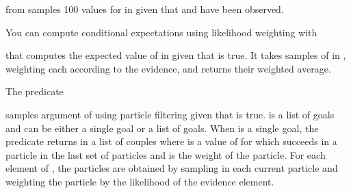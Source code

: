 \documentclass[letterpaper,10pt,english]{sphinxmanual}
\begin{document}
\sphinxAtStartPar
from  samples 100 values for  in  given that  and  have been observed.

\sphinxAtStartPar
You can compute conditional expectations using likelihood weighting with

\begin{sphinxVerbatim}[commandchars=\\\{\}]
  
\end{sphinxVerbatim}

\sphinxAtStartPar
that computes the expected value of  in  given that  is true.
It takes  samples of  in , weighting each according to the evidence, and returns their weighted average.

\sphinxAtStartPar
The predicate

\begin{sphinxVerbatim}[commandchars=\\\{\}]
  
\end{sphinxVerbatim}

\sphinxAtStartPar
samples argument  of  using particle filtering given that  is true.  is a list of goals and  can be either a single goal or a list of goals.
When  is a single goal, the predicate returns in  a list of couples  where  is a value of  for which  succeeds in a particle in the last set of particles and  is the weight of the particle.
For each element of , the particles are obtained by sampling  in each current particle and weighting the particle by the likelihood of the evidence element.
\end{document}
